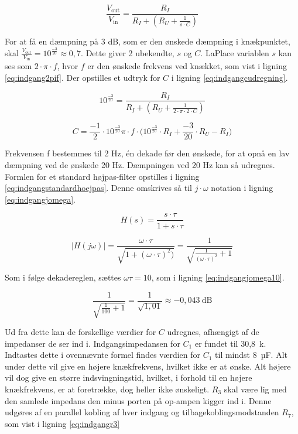 \begin{equation}
\label{eq:indganghoejpas}
\frac{V_{\mathrm{out}}}{V_{\mathrm{in}}}=\frac{R_I}{R_I+(R_U+\frac{1}{s\cdot C})}
\end{equation}

For at få en dæmpning på 3 dB, som er den ønskede dæmpning i knækpunktet, skal $\frac{V_{\mathrm{out}}}{V_{\mathrm{in}}}=10^{\frac{-3}{20}}\approx0,7$. 
Dette giver 2 ubekendte, $s$ og $C$. LaPlace variablen $s$ kan ses som $2\cdot \pi \cdot f$, hvor $f$ er den ønskede frekvens ved knækket, som vist i ligning \ref{eq:indgang2pif}. Der opstilles et udtryk for $C$ i ligning \ref{eq:indgangcudregning}.

\begin{equation}
\label{eq:indgang2pif}
10^{\frac{-3}{20}}=\frac{R_I}{R_I+(R_U+\frac{1}{2\cdot\pi\cdot 2\cdot C})}
\end{equation}

\begin{equation}
\label{eq:indgangcudregning}
C=\frac{-1}{2}\cdot{10^{\frac{-3}{20}}}{\pi\cdot f\cdot(10^{\frac{-3}{20}}\cdot R_I+\frac{-3}{20}}\cdot R_U - R_I)
\end{equation}

Frekvensen f bestemmes til 2 Hz, én dekade før den ønskede, for at opnå en lav dæmpning ved de ønskede 20 Hz. Dæmpningen ved 20 Hz kan så udregnes. Formlen for et standard højpas-filter opstilles i ligning \ref{eq:indgangstandardhoejpas}. Denne omskrives så til $j\cdot\omega$ notation i ligning \ref{eq:indgangjomega}.

\begin{equation}
\label{eq:indgangstandardhoejpas}
H(s)=\frac{s\cdot\tau}{1+s\cdot\tau}
\end{equation}

\begin{equation}
\label{eq:indgangjomega}
|H(j\omega)|=\frac{\omega\cdot\tau}{\sqrt{1+(\omega\cdot\tau)^2)}}=\frac{1}{\sqrt{\frac{1}{(\omega\cdot\tau)^2}+1}}
\end{equation}

Som i følge dekadereglen, sættes $\omega\tau = 10$, som i ligning \ref{eq:indgangjomega10}.

\begin{equation}
\label{eq:indgangjomega10}
\frac{1}{\sqrt{\frac{1}{100}+1}}=\frac{1}{\sqrt{1,01}}\approx -0,043~\mathrm{dB}
\end{equation}

Ud fra dette kan de forskellige værdier for $C$ udregnes, afhængigt af de impedanser de ser ind i.
Indgangsimpedansen for $C_1$ er fundet til 30,8~k\ohm . Indtastes dette i ovennævnte formel findes værdien for $C_1$ til mindst 8~µF. Alt under dette vil give en højere knækfrekvens, hvilket ikke er at ønske. Alt højere vil dog give en større indsvingningstid, hvilket, i forhold til en højere knækfrekvens, er at foretrække, dog heller ikke ønskeligt.
$R_3$ skal være lig med den samlede impedans den minus porten på op-ampen kigger ind i. Denne udgøres af en parallel kobling af hver indgang og tilbagekoblingsmodstanden $R_7$, som vist i ligning \ref{eq:indgangr3}

